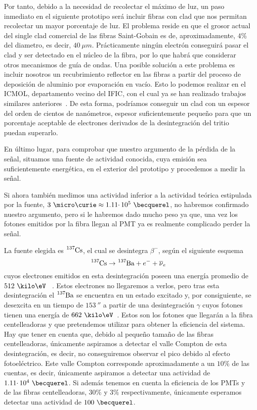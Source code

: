 Por tanto, debido a la necesidad de recolectar el máximo de luz, un paso inmediato en el siguiente prototipo será incluir fibras con clad que nos permitan recolectar un mayor porcentaje de luz. El problema reside en que el grosor actual del single clad comercial de las fibras Saint-Gobain es de, aproximadamente, $4\%$ del diametro, es decir, $40~\mu m$. Prácticamente ningún electrón conseguirá pasar el clad y ser detectado en el núcleo de la fibra, por lo que habrá que considerar otros mecanismos de guía de ondas. Una posible solución a este problema es incluir nosotros un recubrimiento reflector en las fibras a partir del proceso de deposición de aluminio por evaporación en vacío. Esto lo podemos realizar en el ICMOL, departamento vecino del IFIC, con el cual ya se han realizado trabajos similares anteriores~\cite{cladtesis,cladarticulo}. De esta forma, podríamos conseguir un clad con un espesor del orden de cientos de nanómetros, espesor suficientemente pequeño para que un porcentaje aceptable de electrones derivados de la desintegración del tritio puedan superarlo. 

En último lugar, para comprobar que nuestro argumento de la pérdida de la señal, situamos una fuente de actividad conocida, cuya emisión sea suficientemente energética, en el exterior del prototipo y procedemos a medir la señal. 

Si ahora también medimos una actividad inferior a la actividad teórica estipulada por la fuente, $3~\micro\curie \approx 1.11 \cdotp 10^{5}~\becquerel$, no habremos confirmado nuestro argumento, pero si le habremos dado mucho peso ya que, una vez los fotones emitidos por la fibra llegan al PMT ya es realmente complicado perder la señal. 

La fuente elegida es $\ce{^{137}Cs}$, el cual se desintegra $\beta^{-}$, según el siguiente esquema
\begin{equation}
\ce{^{137}Cs} \rightarrow \ce{^{137}Ba} + e^- + \overline{\nu}_e
\label{desintegracionbeta}
\end{equation}
cuyos electrones emitidos en esta desintegración poseen una energía promedio de $512~\kilo\eV$ ~\cite{Isotopos}. Estos electrones no llegaremos a verlos, pero tras esta desintegración el $\ce{^{137}Ba}$ se encuentra en un estado excitado y, por consiguiente, se desexcita en un tiempo de $153~\second$  a partir de una desintegración $\gamma$ cuyos fotones tienen una energía de $662~\kilo\eV$~\cite{Isotopos}. Estos son los fotones que llegarán a la fibra centelleadoras y que pretendemos utilizar para obtener la eficiencia del sistema. Hay que tener en cuenta que, debido al pequeño tamaño de las fibras centelleadoras, únicamente aspiramos a detectar el valle Compton de esta desintegración, es decir, no conseguiremos observar el pico debido al efecto fotoeléctrico. Este valle Compton corresponde aproximadamente a un $10\%$ de las cuentas, es decir, únicamente aspiramos a detectar una actividad de $1.11 \cdotp 10^{4}~\becquerel$. Si además tenemos en cuenta la eficiencia de los PMTs y de las fibras centelleadoras, $30\%$ y $3\%$ respectivamente, únicamente esperamos detectar una actividad de $100~\becquerel $.

